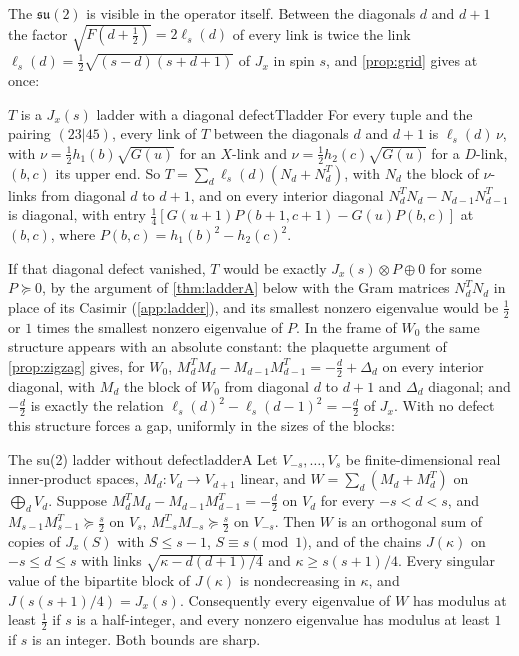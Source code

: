 The $\mathfrak{su}(2)$ is visible in the operator itself. Between the diagonals $d$ and $d+1$ the
factor $\sqrt{F(d+\frac12)}=2\ell_s(d)$ of every link is twice the link
$\ell_s(d)=\frac12\sqrt{(s-d)(s+d+1)}$ of $J_x$ in spin $s$, and \cref{prop:grid} gives at
once:

\begin{proposition}{$T$ is a $J_x(s)$ ladder with a diagonal defect}{Tladder}
For every tuple and the pairing $(23|45)$, every link of $T$ between the diagonals $d$
and $d+1$ is $\ell_s(d)\,\nu$, with $\nu=\frac12h_1(b)\sqrt{G(u)}$ for an $X$-link and
$\nu=\frac12h_2(c)\sqrt{G(u)}$ for a $D$-link, $(b,c)$ its upper end. So
$T=\sum_d\ell_s(d)(N_d+N_d^T)$, with $N_d$ the block of $\nu$-links from diagonal $d$ to
$d+1$, and on every interior diagonal $N_d^TN_d-N_{d-1}N_{d-1}^T$ is diagonal, with entry
$\frac14[G(u+1)P(b+1,c+1)-G(u)P(b,c)]$ at $(b,c)$, where $P(b,c)=h_1(b)^2-h_2(c)^2$.
\end{proposition}

If that diagonal defect vanished, $T$ would be exactly $J_x(s)\otimes P\oplus0$ for some
$P\succeq0$, by the argument of \cref{thm:ladderA} below with the Gram matrices
$N_d^TN_d$ in place of its Casimir (\cref{app:ladder}), and its smallest nonzero
eigenvalue would be $\frac12$ or $1$ times the smallest nonzero eigenvalue of $P$. In
the frame of $W_0$ the same structure appears with an absolute constant: the plaquette
argument of \cref{prop:zigzag} gives, for $W_0$, $M_d^TM_d-M_{d-1}M_{d-1}^T=-\frac d2+\Delta_d$
on every interior diagonal, with $M_d$ the block of $W_0$ from diagonal $d$ to $d+1$ and
$\Delta_d$ diagonal; and $-\frac d2$ is exactly the relation
$\ell_s(d)^2-\ell_s(d-1)^2=-\frac d2$ of $J_x$. With no defect this structure forces a
gap, uniformly in the sizes of the blocks:

\begin{theorem}{The su(2) ladder without defect}{ladderA}
Let $V_{-s},\dots,V_s$ be finite-dimensional real inner-product spaces, $M_d:V_d\to V_{d+1}$
linear, and $W=\sum_d(M_d+M_d^T)$ on $\bigoplus_dV_d$. Suppose
$M_d^TM_d-M_{d-1}M_{d-1}^T=-\frac d2$ on $V_d$ for every $-s<d<s$, and
$M_{s-1}M_{s-1}^T\succeq\frac s2$ on $V_s$, $M_{-s}^TM_{-s}\succeq\frac s2$ on $V_{-s}$. Then
$W$ is an orthogonal sum of copies of $J_x(S)$ with $S\le s-1$, $S\equiv s\pmod1$, and of
the chains $J(\kappa)$ on $-s\le d\le s$ with links $\sqrt{\kappa-d(d+1)/4}$ and
$\kappa\ge s(s+1)/4$. Every singular value of the bipartite block of $J(\kappa)$ is
nondecreasing in $\kappa$, and $J(s(s+1)/4)=J_x(s)$. Consequently every eigenvalue of $W$
has modulus at least $\frac12$ if $s$ is a half-integer, and every nonzero eigenvalue has
modulus at least $1$ if $s$ is an integer. Both bounds are sharp.
\end{theorem}

